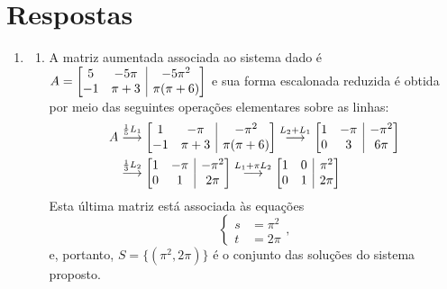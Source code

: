\documentclass[12pt,a4paper]{article}
\makeatletter
\newenvironment{amatrix}[1]{%
  \left[\begin{array}{@{}*{#1}{c}|c@{}}
}{%
  \end{array}\right]
}
\newcommand{\grstep}[2][\relax]{%
   \ensuremath{\mathrel{
       {\mathop{\longrightarrow}\limits^{#2\mathstrut}_{
                                     \begin{subarray}{l} #1 \end{subarray}}}}}}
\makeatother
\begin{document}
\section*{Respostas}
\begin{enumerate}
\item \begin{enumerate}
\item A matriz aumentada associada ao sistema dado é $A = \begin{amatrix}{2}
   5 & -5\pi & -5\pi^2 \\
-1 & \pi+3 & \pi(\pi + 6)
\end{amatrix}$
e sua forma escalonada reduzida é obtida por meio das seguintes operações elementares sobre as linhas:
\begin{align*}
A
&
\grstep{ \frac{1}{5} L_1 }
\begin{amatrix}{2}
   1 & -\pi & -\pi^2 \\
-1 & \pi+3 & \pi(\pi + 6)
\end{amatrix}
\grstep{ L_2 + L_1 }
\begin{amatrix}{2}
   1 & -\pi & -\pi^2 \\
   0 &    3 & 6\pi
\end{amatrix} \\
&
\grstep{ \frac{1}{3} L_2 }
\begin{amatrix}{2}
   1 & -\pi & -\pi^2 \\
   0 &    1 & 2\pi
\end{amatrix}
\grstep{ L_1 + \pi L_2 }
\begin{amatrix}{2}
   1 & 0 & \pi^2 \\
   0 & 1 & 2\pi
\end{amatrix}
\end{align*}
Esta última matriz está associada às equações
\[
\left\{
\begin{aligned}
s & = \pi^2 \\
t & = 2\pi
\end{aligned}
\right.,
\]
e, portanto, $S = \{ ( \pi^2, 2\pi ) \}$ é o conjunto das soluções do sistema proposto.


\end{enumerate}
\end{enumerate}
\end{document}
